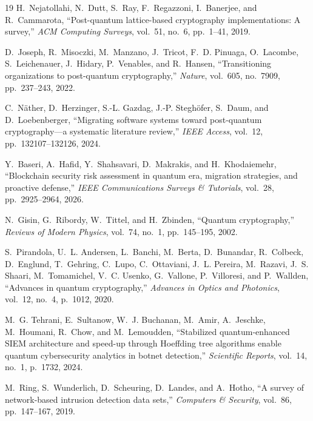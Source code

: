 \documentclass[conference]{IEEEtran}
\begin{document}
\begin{thebibliography}{19}
H.~Nejatollahi, N.~Dutt, S.~Ray, F.~Regazzoni, I.~Banerjee, and R.~Cammarota, ``Post-quantum lattice-based cryptography implementations: A survey,'' \emph{ACM Computing Surveys}, vol.~51, no.~6, pp.~1--41, 2019.

D.~Joseph, R.~Misoczki, M.~Manzano, J.~Tricot, F.~D. Pinuaga, O.~Lacombe, S.~Leichenauer, J.~Hidary, P.~Venables, and R.~Hansen, ``Transitioning organizations to post-quantum cryptography,'' \emph{Nature}, vol.~605, no.~7909, pp.~237--243, 2022.

C.~N\"ather, D.~Herzinger, S.-L. Gazdag, J.-P. Stegh\"ofer, S.~Daum, and D.~Loebenberger, ``Migrating software systems toward post-quantum cryptography---a systematic literature review,'' \emph{IEEE Access}, vol.~12, pp.~132107--132126, 2024.

Y.~Baseri, A.~Hafid, Y.~Shahsavari, D.~Makrakis, and H.~Khodaiemehr, ``Blockchain security risk assessment in quantum era, migration strategies, and proactive defense,'' \emph{IEEE Communications Surveys \& Tutorials}, vol.~28, pp.~2925--2964, 2026.

N.~Gisin, G.~Ribordy, W.~Tittel, and H.~Zbinden, ``Quantum cryptography,'' \emph{Reviews of Modern Physics}, vol.~74, no.~1, pp.~145--195, 2002.

S.~Pirandola, U.~L. Andersen, L.~Banchi, M.~Berta, D.~Bunandar, R.~Colbeck, D.~Englund, T.~Gehring, C.~Lupo, C.~Ottaviani, J.~L. Pereira, M.~Razavi, J.~S. Shaari, M.~Tomamichel, V.~C. Usenko, G.~Vallone, P.~Villoresi, and P.~Wallden, ``Advances in quantum cryptography,'' \emph{Advances in Optics and Photonics}, vol.~12, no.~4, p.~1012, 2020.

M.~G. Tehrani, E.~Sultanow, W.~J. Buchanan, M.~Amir, A.~Jeschke, M.~Houmani, R.~Chow, and M.~Lemoudden, ``Stabilized quantum-enhanced SIEM architecture and speed-up through Hoeffding tree algorithms enable quantum cybersecurity analytics in botnet detection,'' \emph{Scientific Reports}, vol.~14, no.~1, p.~1732, 2024.

M.~Ring, S.~Wunderlich, D.~Scheuring, D.~Landes, and A.~Hotho, ``A survey of network-based intrusion detection data sets,'' \emph{Computers \& Security}, vol.~86, pp.~147--167, 2019.

\end{thebibliography}
\end{document}
